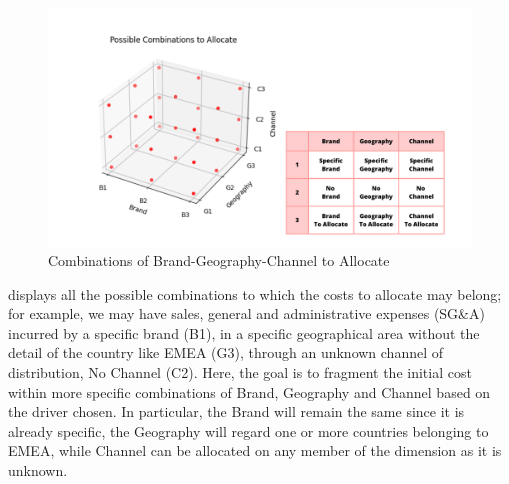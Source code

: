 \documentclass[12pt,a4paper,openright,twoside]{book}
\begin{document}
\begin{figure}[htbp]
	\centering
	\includegraphics[width=\linewidth]{figures/combinations.pdf}
	\caption{Combinations of Brand-Geography-Channel to Allocate}
	\label{fig:combos}
\end{figure}

 displays all the possible combinations to which the costs to allocate may belong; for example, we may have sales, general and administrative expenses (SG\&A) incurred by a specific brand (B1), in a specific geographical area without the detail of the country like EMEA (G3), through an unknown channel of distribution, No Channel (C2).
%
Here, the goal is to fragment the initial cost within more specific combinations of Brand, Geography and Channel based on the driver chosen.
%
In particular, the Brand will remain the same since it is already specific, the Geography will regard one or more countries belonging to EMEA, while Channel can be allocated on any member of the dimension as it is unknown.
\end{document}
